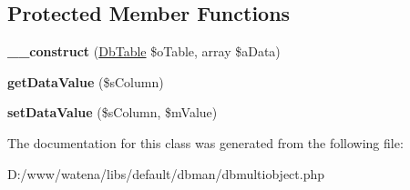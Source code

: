 \subsection*{Protected Member Functions}
\begin{DoxyCompactItemize}
\item 
\hypertarget{class_db_multi_object_a720f8adb729f2946784338089979e20e}{{\bfseries \-\_\-\-\_\-construct} (\hyperlink{class_db_table}{Db\-Table} \$o\-Table, array \$a\-Data)}\label{class_db_multi_object_a720f8adb729f2946784338089979e20e}

\item 
\hypertarget{class_db_multi_object_adaff70ae43790d32ea6e626711ff561e}{{\bfseries get\-Data\-Value} (\$s\-Column)}\label{class_db_multi_object_adaff70ae43790d32ea6e626711ff561e}

\item 
\hypertarget{class_db_multi_object_a3d1024edc48e66f484095d9a9ad77ff5}{{\bfseries set\-Data\-Value} (\$s\-Column, \$m\-Value)}\label{class_db_multi_object_a3d1024edc48e66f484095d9a9ad77ff5}

\end{DoxyCompactItemize}


The documentation for this class was generated from the following file\-:\begin{DoxyCompactItemize}
\item 
D\-:/www/watena/libs/default/dbman/dbmultiobject.\-php\end{DoxyCompactItemize}
